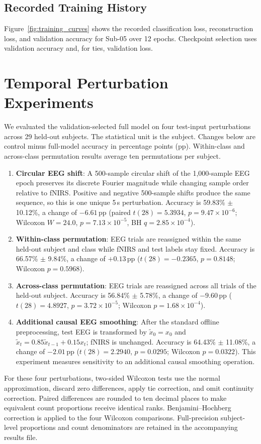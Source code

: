 \documentclass[final,5p,times,twocolumn]{elsarticle}
\begin{document}
\subsection{Recorded Training History}
Figure~\ref{fig:training_curves} shows the recorded classification loss, reconstruction loss, and validation accuracy for Sub-05 over 12 epochs. Checkpoint selection uses validation accuracy and, for ties, validation loss.

\section{Temporal Perturbation Experiments}
We evaluated the validation-selected full model on four test-input perturbations across 29 held-out subjects. The statistical unit is the subject. Changes below are control minus full-model accuracy in percentage points (pp). Within-class and across-class permutation results average ten permutations per subject.
\begin{enumerate}
\item \textbf{Circular EEG shift}: A 500-sample circular shift of the 1,000-sample EEG epoch preserves its discrete Fourier magnitude while changing sample order relative to fNIRS. Positive and negative 500-sample shifts produce the same sequence, so this is one unique 5\,s perturbation. Accuracy is 59.83\% $\pm$ 10.12\%, a change of $-6.61$\,pp (paired $t(28)=5.3934$, $p=9.47 \times 10^{-6}$; Wilcoxon $W=24.0$, $p=7.13 \times 10^{-5}$, BH $q=2.85 \times 10^{-4}$).
\item \textbf{Within-class permutation}: EEG trials are reassigned within the same held-out subject and class while fNIRS and test labels stay fixed. Accuracy is 66.57\% $\pm$ 9.84\%, a change of $+0.13$\,pp ($t(28)=-0.2365$, $p=0.8148$; Wilcoxon $p=0.5968$).
\item \textbf{Across-class permutation}: EEG trials are reassigned across all trials of the held-out subject. Accuracy is 56.84\% $\pm$ 5.78\%, a change of $-9.60$\,pp ($t(28)=4.8927$, $p=3.72 \times 10^{-5}$; Wilcoxon $p=1.68 \times 10^{-4}$).
\item \textbf{Additional causal EEG smoothing}: After the standard offline preprocessing, test EEG is transformed by $\widetilde{x}_0=x_0$ and $\widetilde{x}_t=0.85\widetilde{x}_{t-1}+0.15x_t$; fNIRS is unchanged. Accuracy is 64.43\% $\pm$ 11.08\%, a change of $-2.01$\,pp ($t(28)=2.2940$, $p=0.0295$; Wilcoxon $p=0.0322$). This experiment measures sensitivity to an additional causal smoothing operation.
\end{enumerate}
For these four perturbations, two-sided Wilcoxon tests use the normal approximation, discard zero differences, apply tie correction, and omit continuity correction. Paired differences are rounded to ten decimal places to make equivalent count proportions receive identical ranks. Benjamini--Hochberg correction is applied to the four Wilcoxon comparisons. Full-precision subject-level proportions and count denominators are retained in the accompanying results file.
\end{document}
